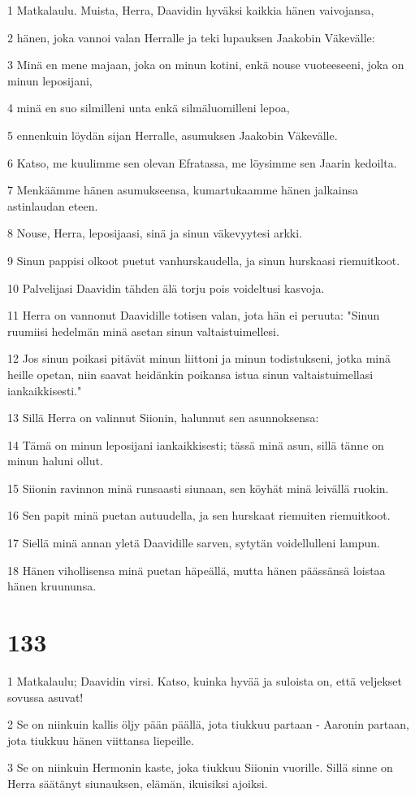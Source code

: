 \par 1 Matkalaulu. Muista, Herra, Daavidin hyväksi kaikkia hänen vaivojansa,
\par 2 hänen, joka vannoi valan Herralle ja teki lupauksen Jaakobin Väkevälle:
\par 3 Minä en mene majaan, joka on minun kotini, enkä nouse vuoteeseeni, joka on minun leposijani,
\par 4 minä en suo silmilleni unta enkä silmäluomilleni lepoa,
\par 5 ennenkuin löydän sijan Herralle, asumuksen Jaakobin Väkevälle.
\par 6 Katso, me kuulimme sen olevan Efratassa, me löysimme sen Jaarin kedoilta.
\par 7 Menkäämme hänen asumukseensa, kumartukaamme hänen jalkainsa astinlaudan eteen.
\par 8 Nouse, Herra, leposijaasi, sinä ja sinun väkevyytesi arkki.
\par 9 Sinun pappisi olkoot puetut vanhurskaudella, ja sinun hurskaasi riemuitkoot.
\par 10 Palvelijasi Daavidin tähden älä torju pois voideltusi kasvoja.
\par 11 Herra on vannonut Daavidille totisen valan, jota hän ei peruuta: "Sinun ruumiisi hedelmän minä asetan sinun valtaistuimellesi.
\par 12 Jos sinun poikasi pitävät minun liittoni ja minun todistukseni, jotka minä heille opetan, niin saavat heidänkin poikansa istua sinun valtaistuimellasi iankaikkisesti."
\par 13 Sillä Herra on valinnut Siionin, halunnut sen asunnoksensa:
\par 14 Tämä on minun leposijani iankaikkisesti; tässä minä asun, sillä tänne on minun haluni ollut.
\par 15 Siionin ravinnon minä runsaasti siunaan, sen köyhät minä leivällä ruokin.
\par 16 Sen papit minä puetan autuudella, ja sen hurskaat riemuiten riemuitkoot.
\par 17 Siellä minä annan yletä Daavidille sarven, sytytän voidellulleni lampun.
\par 18 Hänen vihollisensa minä puetan häpeällä, mutta hänen päässänsä loistaa hänen kruununsa.

\chapter{133}

\par 1 Matkalaulu; Daavidin virsi. Katso, kuinka hyvää ja suloista on, että veljekset sovussa asuvat!
\par 2 Se on niinkuin kallis öljy pään päällä, jota tiukkuu partaan - Aaronin partaan, jota tiukkuu hänen viittansa liepeille.
\par 3 Se on niinkuin Hermonin kaste, joka tiukkuu Siionin vuorille. Sillä sinne on Herra säätänyt siunauksen, elämän, ikuisiksi ajoiksi.

